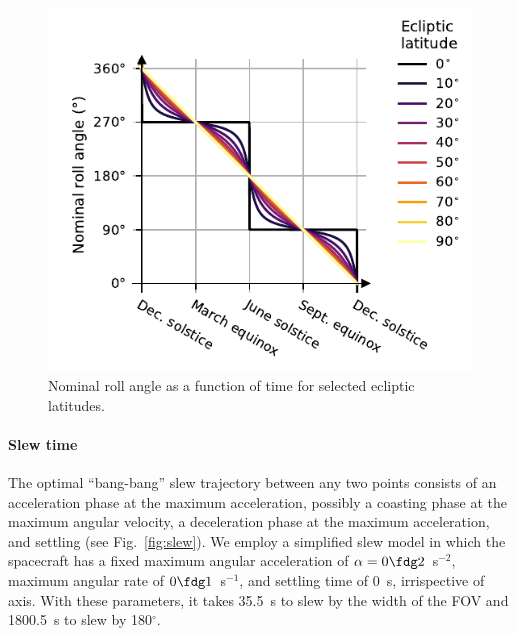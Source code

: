 \documentclass[twocolumn,times]{aastex631}
\begin{document}
\begin{figure}
    \includegraphics[width=\columnwidth]{figures/nominal-roll}
    \caption{\label{fig:nominal-roll}Nominal roll angle as a function of time for selected ecliptic latitudes.}
\end{figure}

\paragraph{Slew time}
The optimal ``bang-bang'' slew trajectory between any two points consists of an acceleration phase at the maximum acceleration, possibly a coasting phase at the maximum angular velocity, a deceleration phase at the maximum acceleration, and settling (see Fig.~\ref{fig:slew}). We employ a simplified slew model in which the spacecraft has a fixed maximum angular acceleration of $\alpha=0 \fdg 2$~s$^{-2}$, maximum angular rate of $0 \fdg 1$~s$^{-1}$, and settling time of 0~s, irrispective of axis. With these parameters, it takes 35.5~s to slew by the width of the \ac{FOV} and 1800.5~s to slew by 180$^\circ$.
\end{document}
